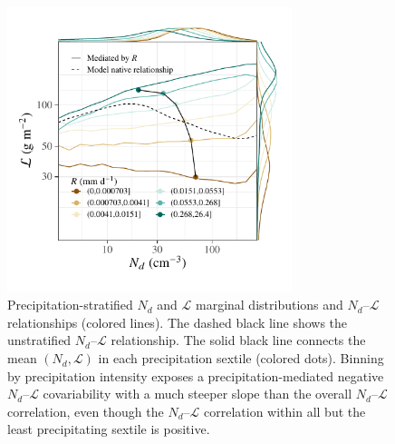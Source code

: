 \documentclass[acp, manuscript]{copernicus}\usepackage[]{graphicx}\usepackage[]{xcolor}
\newenvironment{knitrout}{}{} %
\newcommand\nd{\ensuremath{N_d}}
\newcommand\lwp{\ensuremath{\mathcal L}}
\begin{document}
\begin{figure}[t]
  \centering
\begin{knitrout}
\color{fgcolor}

{\centering \includegraphics[width=8.3cm]{figure/precip-lwp-cdnc-1} 

}


\end{knitrout}
  \caption{Precipitation-stratified \nd{} and \lwp{} marginal distributions
    and \nd--\lwp{} relationships (colored lines).  The dashed black line shows
    the unstratified \nd--\lwp{} relationship.  The solid black line connects
    the mean $(\nd,\lwp)$ in each precipitation sextile (colored dots).
    Binning by precipitation intensity exposes a precipitation-mediated 
    negative \nd--\lwp{} covariability with a much steeper slope than the overall
    \nd--\lwp{} correlation, even though the \nd--\lwp{} correlation within all but the
    least precipitating sextile is positive.}
  \label{fig:precip}
\end{figure}
%
\clearpage
%
\end{document}
